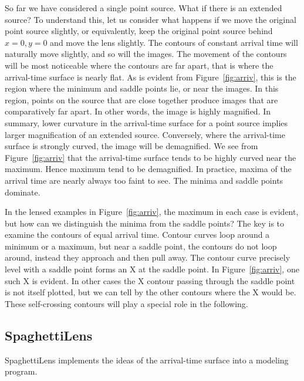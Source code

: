 \documentclass[12pt,preprint]{aastex}
\newcommand{\spl}{SpaghettiLens\xspace}
\newcommand{\figref}[1]{Figure~\ref{fig:#1}}
\begin{document}
So far we have considered a single point source.  What if there is an
extended source?  To understand this, let us consider what happens if
we move the original point source slightly, or equivalently, keep the
original point source behind $x=0,y=0$ and move the lens slightly.
The contours of constant arrival time will naturally move slightly,
and so will the images.  The movement of the contours will be most
noticeable where the contours are far apart, that is where the
arrival-time surface is nearly flat.  As is evident from
\figref{arriv}, this is the region where the minimum and saddle
points lie, or near the images.  In this region, points on the source
that are close together produce images that are comparatively far
apart.  In other words, the image is highly magnified.  In summary,
lower curvature in the arrival-time surface for a point source implies
larger magnification of an extended source.  Conversely, where the
arrival-time surface is strongly curved, the image will be
demagnified.  We see from \figref{arriv} that the arrival-time
surface tends to be highly curved near the maximum.  Hence maximum tend
to be demagnified.  In practice, maxima of the arrival time are nearly
always too faint to see. The minima and saddle points dominate.

In the lensed examples in \figref{arriv}, the maximum in each
case is evident, but how can we distinguish the minima from the saddle
points?  The key is to examine the contours of equal arrival time.
Contour curves loop around a minimum or a maximum, but near a saddle
point, the contours do not loop around, instead they approach and then
pull away.  The contour curve precisely level with a saddle point
forms an X at the saddle point.  In \figref{arriv}, one such X
is evident.  In other cases the X contour passing through the saddle
point is not itself plotted, but we can tell by the other contours where
the X would be.  These self-crossing contours will play a special role
in the following.

\subsection{\spl} \label{sec:SpaghettiLens}

\spl implements the ideas of the arrival-time surface into a modeling
program.
\end{document}
